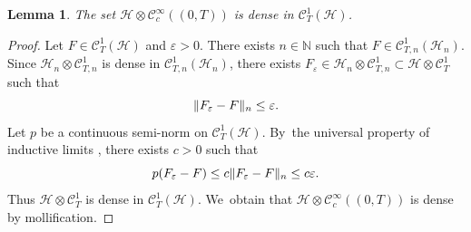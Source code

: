 \documentclass[JEP,XML,SOM,Unicode,published]{cedram}
\newtheorem{lemma}[theorem]{Lemma}
\theoremstyle{definition}
\theoremstyle{remark}
\DeclarePairedDelimiter{\norm}{\lVert}{\rVert}
\begin{document}
\begin{lemma}\label{t:density-tensor-product}
The set $\mathscr{H} \otimes \mathscr{C}_{c}^{\infty}((0,T))$ is dense in $\mathscr{C}^{1}_{T}(\mathscr{H})$.
\end{lemma}
\begin{proof}
Let $F \in \mathscr{C}^{1}_{T}(\mathscr{H})$ and $\varepsilon > 0$.
There exists $n \in \mathbb{N}$ such that $F \in \mathscr{C}^{1}_{T,n}(\mathscr{H}_{n})$.
Since $\mathscr{H}_{n} \otimes \mathscr{C}_{T,n}^{1}$ is dense in $\mathscr{C}_{T,n}^{1}(\mathscr{H}_{n})$, there exists $F_{\varepsilon} \in \mathscr{H}_{n} \otimes \mathscr{C}_{T,n}^{1} \subset \mathscr{H} \otimes \mathscr{C}_{T}^{1}$ such that
\begin{equation*}
\norm{F_{\varepsilon} - F}_{n} \leq \varepsilon.
\end{equation*}
Let $p$ be a continuous semi-norm on $\mathscr{C}^{1}_{T}(\mathscr{H})$.
By~the universal property of inductive limits \cite[Prop.\,5, p.\,II.29]{BourbakiEVT}, there exists $c > 0$ such that
\begin{equation*}
p(F_{\varepsilon} - F) \leq c \norm{F_{\varepsilon} - F}_{n} \leq c \varepsilon.
\end{equation*}
Thus $\mathscr{H} \otimes \mathscr{C}_{T}^{1}$ is dense in $\mathscr{C}_{T}^{1}(\mathscr{H})$. We~obtain that $\mathscr{H} \otimes \mathscr{C}_{c}^{\infty}((0,T))$ is dense by mollification.
\end{proof}
\end{document}
